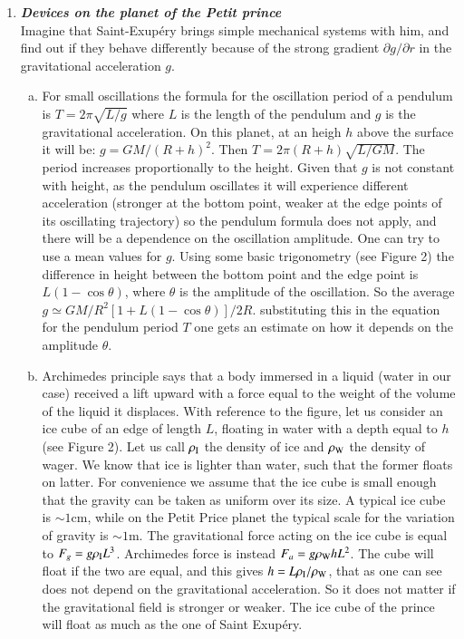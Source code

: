 \documentclass[a4paper,12pt]{article}
\newcommand{\question}[1]{\textbf{\textit{#1}}}
\begin{document}
\begin{enumerate}
\item \question{Devices on the planet of the Petit prince}\\
Imagine that Saint-Exup{\'e}ry brings simple mechanical systems with him, and find out if they behave differently because of the strong gradient $\partial g/\partial r$ in the gravitational acceleration $g$.
\begin{enumerate}[(a)]
\item{For small oscillations the formula for the oscillation period of
  a pendulum is $T=2\pi\sqrt{L/g}$ where $L$ is the length of the
  pendulum and $g$ is the gravitational acceleration. On this planet,
  at an heigh $h$ above the surface it will be:
  $g=GM/(R+h)^2$. Then $T=2\pi (R+h)\sqrt{L/GM}$. The period increases
  proportionally to the height. Given that $g$ is not constant with
  height, as the pendulum oscillates it will experience different
  acceleration (stronger at the bottom point, weaker at the edge points
  of its oscillating trajectory) so the pendulum formula does not
  apply, and there will be a dependence on the oscillation
  amplitude. One can try to use a mean values for $g$. Using some
  basic trigonometry (see Figure 2) the difference in height between the bottom
  point and the edge point is $L(1-\cos{\theta})$, where $\theta$ is
  the amplitude of the oscillation. So the average $g \simeq
  GM/R^2[1+L(1-\cos{\theta})]/2R$. substituting this in the equation
  for the pendulum period $T$ one gets an estimate on how it depends
  on the amplitude $\theta$.}
\item{Archimedes principle says that a body immersed in a liquid
    (water in our case) received a lift upward with a force equal to
    the weight of the volume of the liquid it displaces. With
    reference to the figure, let us consider an ice cube of an edge of
    length $L$, floating in water with a depth equal to $h$ (see
    Figure 2). Let us
    call $\rho_{\rm I}$ the density of ice and $\rho_{\rm W}$ the
    density of wager. We know that ice is lighter than water, such
    that the former floats on latter. For convenience we assume that
    the ice cube is small enough that the gravity can be taken as
    uniform over its size. A typical ice cube is $\sim 1$cm, while on
    the Petit Price planet the typical scale for the variation of
    gravity is $\sim 1$m. The gravitational force acting on
    the ice cube is equal to $F_g=g\rho_{\rm I}L^3$. Archimedes force
  is instead $F_a=g\rho_{\rm W} h L^2$. The cube will float if the two
are equal, and this gives $h= L\rho_{\rm I}/\rho_{\rm W}$, that as one
can see does not depend on the gravitational acceleration. So it does
not matter if the gravitational field is stronger or weaker. The
ice cube of the prince will float as much as the one of Saint Exup{\'e}ry.}



\end{enumerate}
\end{enumerate}
\end{document}
